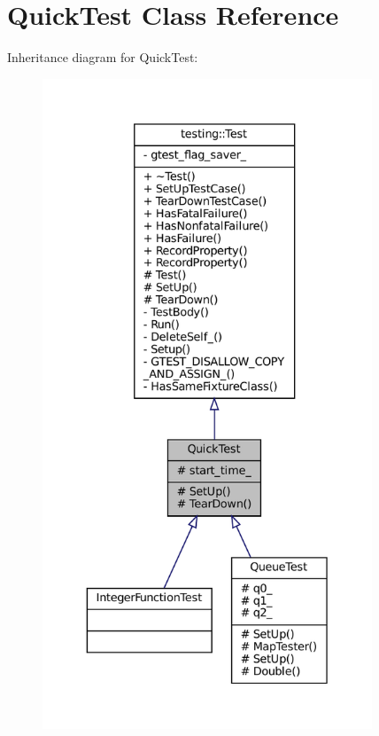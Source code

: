 \hypertarget{classQuickTest}{}\section{Quick\+Test Class Reference}
\label{classQuickTest}


Inheritance diagram for Quick\+Test\+:
\nopagebreak
\begin{figure}[H]
\begin{center}
\leavevmode
\includegraphics[height=550pt]{classQuickTest__inherit__graph}
\end{center}
\end{figure}


